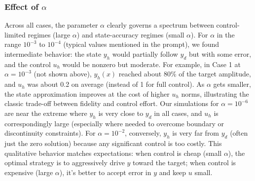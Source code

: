 \documentclass{article}
\begin{document}
\subsubsection{Effect of $\alpha$}
Across all cases, the parameter $\alpha$ clearly governs a spectrum between control-limited regimes (large $\alpha$) and state-accuracy regimes (small $\alpha$). For $\alpha$ in the range $10^{-3}$ to $10^{-4}$ (typical values mentioned in the prompt), we found intermediate behavior: the state $y_h$ would partially follow $y_d$ but with some error, and the control $u_h$ would be nonzero but moderate. For example, in Case 1 at $\alpha=10^{-3}$ (not shown above), $y_h(x)$ reached about 80\% of the target amplitude, and $u_h$ was about 0.2 on average (instead of 1 for full control). As $\alpha$ gets smaller, the state approximation improves at the cost of higher $u_h$ norms, illustrating the classic trade-off between fidelity and control effort. Our simulations for $\alpha=10^{-6}$ are near the extreme where $y_h$ is very close to $y_d$ in all cases, and $u_h$ is correspondingly large (especially where needed to overcome boundary or discontinuity constraints). For $\alpha=10^{-2}$, conversely, $y_h$ is very far from $y_d$ (often just the zero solution) because any significant control is too costly. This qualitative behavior matches expectations: when control is cheap (small $\alpha$), the optimal strategy is to aggressively drive $y$ toward the target; when control is expensive (large $\alpha$), it’s better to accept error in $y$ and keep $u$ small.
\end{document}
